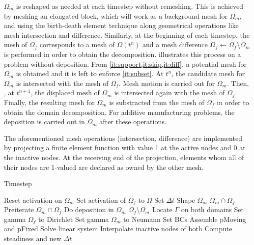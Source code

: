 $\Omega_m$ is reshaped as needed at each timestep
without remeshing. This is achieved by meshing an elongated block,
which will work as a background mesh for $\Omega_m$,
and using the birth-death element technique along geometrical
operations like mesh intersection and difference.
Similarly, at the beginning of each timestep, the mesh of $\Omega_f$ corresponds to
a mesh of $\Omega(t^n)$
and a mesh difference $\Omega_f \leftarrow \Omega_f \setminus \Omega_m$
is performed in order to obtain the decomposition.
 illustrates this process
on a problem without deposition.
From \cref{it:support,it:skip,it:diff}, a potential mesh for $\Omega_m$
is obtained and it is left to enforce \cref{it:subset}.
At $t^n$, the candidate mesh for $\Omega_m$
is intersected with the mesh
of $\Omega_f$.
Mesh motion is carried out for $\Omega_m$.
Then, , at $t^{n+1}$, the displaced mesh of $\Omega_m$
is intersected again with the mesh of $\Omega_f$.
Finally, the resulting mesh for $\Omega_m$
is substracted from the mesh of $\Omega_f$ in order to obtain
the domain decomposition.
For additive manufacturing problems, the deposition
is carried out in $\Omega_m$ after these operations.\par

The aforementioned mesh operations (intersection, difference)
are implemented by projecting a finite element function
with value 1 at the active nodes and 0 at the inactive nodes.
At the receiving end of the projection, elements whom all of their nodes
are 1-valued are declared as owned by the other mesh.\par

\begin{algorithm}
    \caption{Timestep}
    \label{alg:timestep}
    \begin{algorithmic} %
        \State Reset activation on $\Omega_m$
        \State Set activation of $\Omega_f$ to $\Omega$
        \State Set $\Delta t$
        \State Shape $\Omega_m$
        \State $\Omega_m \cap \Omega_f$
        \State Preiterate
        \State $\Omega_m \cap \Omega_f$
        \State Do deposition in $\Omega_m$
        \State $\Omega_f \setminus \Omega_m$
        \State Locate $\Gamma$ on both domains
        \State Set gamma $\Omega_f$ to Dirichlet
        \State Set gamma $\Omega_m$ to Neumann
        \State Set BCs
        \State Assemble pMoving and pFixed
        \State Solve linear system
        \State Interpolate inactive nodes of both
        \State Compute steadiness and new $\Delta t$
    \end{algorithmic}
\end{algorithm}

\iffalse
Show reference model
Go over limitations
Introduce my model
\fi
